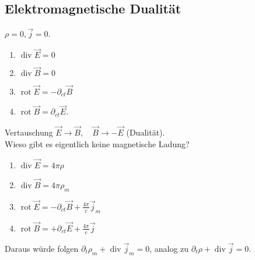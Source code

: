 \documentclass{article}
\newcommand{\rot}{\operatorname{rot}}
\renewcommand{\div}{\operatorname{div}}
\begin{document}
\subsection*{Elektromagnetische Dualität}
$\rho = 0, \vec j = 0$.
\begin{enumerate}
    \item $\div \vec E = 0$
    \item $\div \vec B = 0$
    \item $\rot \vec E = -\partial_{ct} \vec B$
    \item $\rot \vec B = \partial_{ct} \vec E$.
\end{enumerate}
Vertauschung $\vec E \to \vec B,\quad \vec B \to -\vec E$ (Dualität).\\
Wieso gibt es eigentlich keine magnetische Ladung?
\begin{enumerate}
    \item $\div \vec E = 4\pi \rho$
    \item $\div \vec B = 4\pi \rho_m$
    \item $\rot \vec E = -\partial_{ct} \vec B + \frac{4\pi}{c}\vec{j}_m$
    \item $\rot \vec B = +\partial_{ct} \vec E + \frac{4\pi}{c} \vec j$
\end{enumerate}
Daraus würde folgen $\partial_t \rho_m + \div \vec j_m = 0$, analog zu $\partial_t \rho + \div \vec j = 0$.
\end{document}
